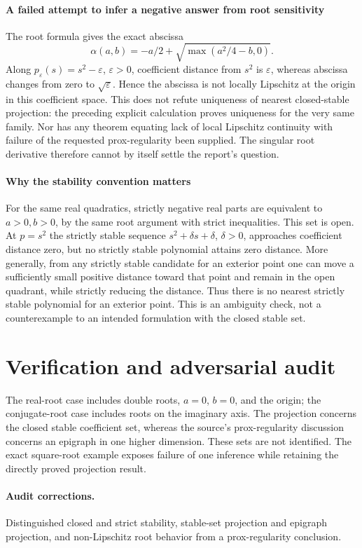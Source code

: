 \documentclass[11pt]{article}
\begin{document}
\paragraph{A failed attempt to infer a negative answer from root sensitivity}
The root formula gives the exact abscissa
\[
 \alpha(a,b)=-a/2+\sqrt{\max(a^2/4-b,0)}.
\]
Along $p_\varepsilon(s)=s^2-\varepsilon$, $\varepsilon>0$, coefficient distance from $s^2$ is $\varepsilon$, whereas abscissa changes from zero to $\sqrt\varepsilon$. Hence the abscissa is not locally Lipschitz at the origin in this coefficient space. This does not refute uniqueness of nearest closed-stable projection: the preceding explicit calculation proves uniqueness for the very same family. Nor has any theorem equating lack of local Lipschitz continuity with failure of the requested prox-regularity been supplied. The singular root derivative therefore cannot by itself settle the report's question.

\paragraph{Why the stability convention matters}
For the same real quadratics, strictly negative real parts are equivalent to $a>0,b>0$, by the same root argument with strict inequalities. This set is open. At $p=s^2$ the strictly stable sequence $s^2+\delta s+\delta$, $\delta>0$, approaches coefficient distance zero, but no strictly stable polynomial attains zero distance. More generally, from any strictly stable candidate for an exterior point one can move a sufficiently small positive distance toward that point and remain in the open quadrant, while strictly reducing the distance. Thus there is no nearest strictly stable polynomial for an exterior point. This is an ambiguity check, not a counterexample to an intended formulation with the closed stable set.

\section{Verification and adversarial audit}
The real-root case includes double roots, $a=0$, $b=0$, and the origin; the conjugate-root case includes roots on the imaginary axis. The projection concerns the closed stable coefficient set, whereas the source's prox-regularity discussion concerns an epigraph in one higher dimension. These sets are not identified. The exact square-root example exposes failure of one inference while retaining the directly proved projection result.
\paragraph{Audit corrections.} Distinguished closed and strict stability, stable-set projection and epigraph projection, and non-Lipschitz root behavior from a prox-regularity conclusion.
\end{document}
